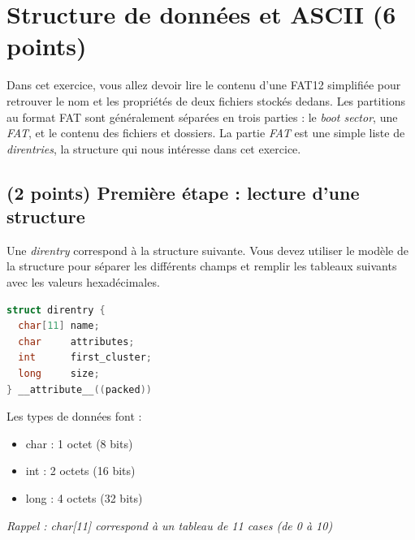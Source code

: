 \documentclass[11pt,a4paper]{article}
\begin{document}




\section{Structure de données et ASCII (6 points)}

\noindent Dans cet exercice, vous allez devoir lire le contenu d'une FAT12 simplifiée pour retrouver le nom et les propriétés de deux fichiers stockés dedans.
Les partitions au format FAT sont généralement séparées en trois parties : le \textit{boot sector}, une \textit{FAT}, et le contenu des fichiers et dossiers.
La partie \textit{FAT} est une simple liste de \textit{direntries}, la structure qui nous intéresse dans cet exercice.

\medskip

\subsection{(2 points) Première étape : lecture d'une structure }

\noindent Une \textit{direntry} correspond à la structure suivante.
Vous devez utiliser le modèle de la structure pour séparer les différents champs et remplir les tableaux suivants avec les valeurs hexadécimales.

\begin{table}[ht!]
  \centering
  \begin{minipage}{0.45\textwidth}
    \centering
\begin{lstlisting}[language=C]
struct direntry {
  char[11] name;
  char     attributes;
  int      first_cluster;
  long     size;
} __attribute__((packed)) \end{lstlisting}
  \end{minipage}
  \hfillx
  \begin{minipage}{0.45\textwidth}
Les types de données font :

\begin{itemize}
\item char : 1 octet (8 bits)
\item int : 2 octets (16 bits)
\item long : 4 octets (32 bits)
\end{itemize}

\textit{Rappel : char[11] correspond à un tableau de 11 cases (de 0 à 10)}
  \end{minipage}
\end{table}
\end{document}
